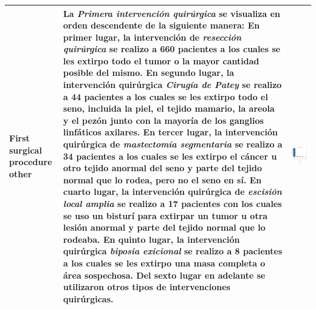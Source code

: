 \begin{table}[!htb]
	\footnotesize
	\begin{threeparttable}
		\begin{tabular}{p{2.5cm} p{7cm} p{6.5cm}} \toprule
			First surgical procedure other
			& La \textit{Primera intervención quirúrgica} se visualiza en orden descendente de la siguiente manera: En primer lugar, la intervención de \textit{resección quirúrgica} se realizo a 660 pacientes a los cuales se les extirpo todo el tumor o la mayor cantidad posible del mismo. En segundo lugar, la intervención quirúrgica \textit{Cirugía de Patey} se realizo a 44 pacientes a los cuales se les extirpo todo el seno, incluida la piel, el tejido mamario, la areola y el pezón junto con la mayoría de los ganglios linfáticos axilares. En tercer lugar, la intervención quirúrgica de \textit{mastectomía segmentaria} se realizo a 34 pacientes a los cuales se les extirpo el cáncer u otro tejido anormal del seno y parte del tejido normal que lo rodea, pero no el seno en sí. En cuarto lugar, la intervención quirúrgica de \textit{escisión local amplia} se realizo a 17 pacientes con los cuales se uso un bisturí para extirpar un tumor u otra lesión anormal y parte del tejido normal que lo rodeaba. En quinto lugar, la intervención quirúrgica \textit{biposia exicional} se realizo a 8 pacientes a los cuales se les extirpo una masa completa o área sospechosa. Del sexto lugar en adelante se utilizaron otros tipos de intervenciones quirúrgicas.
			
			& \begin{center}\includegraphics[width=1\linewidth]{NOTEBOOK/IMAGENES_DESCRIPTIVAS/16_surgical_other}\end{center}
			\\ \hline
			

\end{tabular}
\end{threeparttable}
\end{table}
